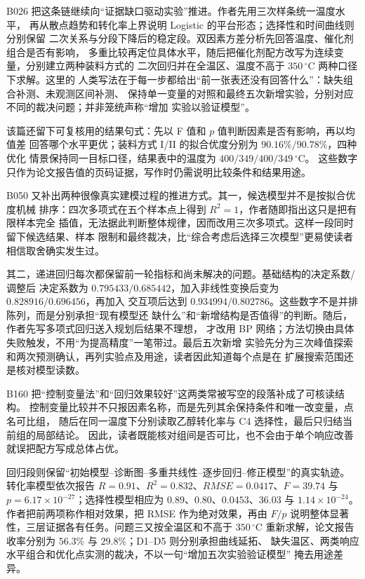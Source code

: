 B026 把这条链继续向“证据缺口驱动实验”推进。作者先用三次样条统一温度水平，
再从散点趋势和转化率上界说明 Logistic 的平台形态；选择性和时间曲线则分别保留
二次关系与分段下降后的稳定段。双因素方差分析先回答温度、催化剂组合是否有影响，
多重比较再定位具体水平，随后把催化剂配方改写为连续变量，分别建立两种装料方式的
二次回归并在全温区、温度不高于 $350\,^{\circ}\mathrm{C}$ 两种口径下求解。这里的
人类写法在于每一步都给出“前一张表还没有回答什么”：缺失组合补测、未观测区间补测、
保持单一变量的对照和最终五次新增实验，分别对应不同的裁决问题；并非笼统声称“增加
实验以验证模型”。

该篇还留下可复核用的结果句式：先以 F 值和 $p$ 值判断因素是否有影响，再以均值差
回答哪个水平更优；装料方式 I/II 的拟合优度分别为 $90.16\%/90.78\%$，四种优化
情景保持同一目标口径，结果表中的温度为 $400/349/400/349\,^{\circ}\mathrm{C}$。
这些数字只作为论文报告值的页码证据，写作时仍需说明比较条件和结果用途。

B050 又补出两种很像真实建模过程的推进方式。其一，候选模型并不是按拟合优度机械
排序：四次多项式在五个样本点上得到 $R^2=1$，作者随即指出这只是把有限样本完全
插值，无法据此判断整体规律，因而改用三次多项式。这样一段同时留下候选结果、样本
限制和最终裁决，比“综合考虑后选择三次模型”更易使读者相信取舍确实发生过。

其二，递进回归每次都保留前一轮指标和尚未解决的问题。基础结构的决定系数/调整后
决定系数为 $0.795433/0.685442$，加入非线性变换后变为 $0.828916/0.696456$，再加入
交互项后达到 $0.934994/0.802786$。这些数字不是并排陈列，而是分别承担“现有模型还
缺什么”和“新增结构是否值得”的判断。随后，作者先写多项式回归送入规划后结果不理想，
才改用 BP 网络；方法切换由具体失败触发，不用“为提高精度”一笔带过。最后五次新增
实验先分为三次峰值探索和两次预测确认，再列实验点及用途，读者因此知道每个点是在
扩展搜索范围还是核对模型读数。

B160 把“控制变量法”和“回归效果较好”这两类常被写空的段落补成了可核读结构。
控制变量比较并不只报因素名称，而是先列其余保持条件和唯一改变量，点名可比组，
随后在同一温度下分别读取乙醇转化率与 C4 选择性，最后只归结当前组的局部结论。
因此，读者既能核对组间是否可比，也不会由于单个响应改善就误把配方写成总体占优。

回归段则保留“初始模型--诊断图--多重共线性--逐步回归--修正模型”的真实轨迹。
转化率模型依次报告 $R=0.91$、$R^2=0.832$、$RMSE=0.0417$、$F=39.74$ 与
$p=6.17\times10^{-27}$；选择性模型相应为 $0.89$、$0.80$、$0.0453$、$36.03$ 与
$1.14\times10^{-24}$。作者把前两项称作相对效果，把 RMSE 作为绝对效果，再由 $F/p$
说明整体显著性，三层证据各有任务。问题三又按全温区和不高于 $350\,^{\circ}\mathrm{C}$
重新求解，论文报告收率分别为 $56.3\%$ 与 $29.8\%$；D1--D5 则分别承担曲线延拓、
缺失温区、两类响应水平组合和优化点实测的裁决，不以一句“增加五次实验验证模型”
掩去用途差异。

